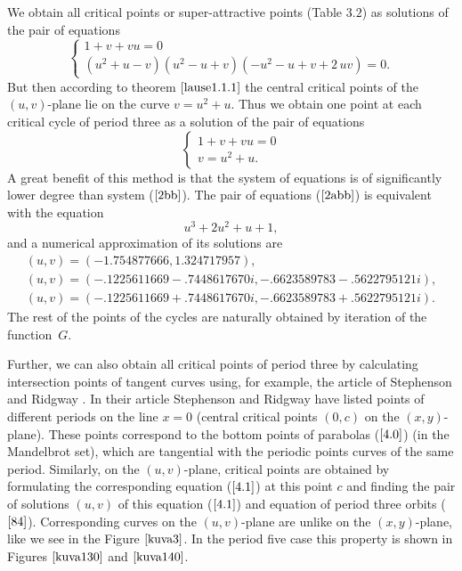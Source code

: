 \documentclass[12pt,a4paper]{amsart}
\numberwithin{equation}{section}
\numberwithin{lause}{section}
\begin{document}
We obtain all critical points or super-attractive points (Table $3.2$) as solutions of the pair of equations
 \begin{equation}
\left\{\begin{array}{l}
      1+v+vu=0 \\
      \left ({u}^{2}+u-v\right )\left
({u}^{2}-u+v\right )\left (- {u}^{2}-u+v+2\,uv\right )=0.\label{2bb}
\end{array}\right.
\end{equation}
 But then according to theorem $\ref{lause1.1.1}$  the central critical points of the $(u,v)$-plane lie on the curve $v=u^{2}+u$. Thus we obtain one point at each critical cycle of period three as a solution of the pair of equations
 \begin{equation}
\left\{\begin{array}{l}
      1+v+vu=0 \\
      v=u^{2}+u. \label{2abb}
\end{array}\right.
\end{equation}
 A great benefit of this method is that the system of equations is of significantly lower degree than system ($\ref{2bb}$). The pair of equations ($\ref{2abb}$) is equivalent with the equation
\begin{displaymath}
u^{3}+2u^{2}+u+1,
\end{displaymath}
and a numerical approximation of its solutions are
\begin{displaymath}
\begin{array}{l}
(u,v)=(-1.754877666,1.324717957),\\ (u,v)=(-.1225611669-.7448617670i, -.6623589783-.5622795121i), \\ (u,v)=(-.1225611669+.7448617670i, -.6623589783+.5622795121i).
\end{array}
\end{displaymath}
The rest of the points of the cycles are naturally obtained by iteration of the function~$G$.

Further, we can also obtain all critical points of period three by calculating intersection points of tangent curves using, for example, the article of Stephenson and Ridgway \cite{3}. In their article Stephenson and Ridgway have listed points of different periods on the line $x=0$ (central critical points $(0,c)$ on the $(x,y)$-plane). These points correspond to the bottom points of parabolas ($\ref{4.0}$) (in the Mandelbrot set), which are tangential with the periodic points curves of the same period. Similarly, on the $(u,v)$-plane, critical points are obtained by formulating the corresponding equation ($\ref{4.1}$) at this point $c$ and finding the pair of solutions $(u,v)$ of this equation ($\ref{4.1}$) and equation of period three orbits ($\ref{84}$). Corresponding curves on the $(u,v)$-plane are unlike on the $(x,y)$-plane, like we see in the Figure $\ref{kuva3}$. In the period five case this property is shown in Figures $\ref{kuva130}$ and  $\ref{kuva140}$.
\end{document}
